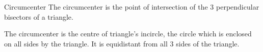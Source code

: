 	\begin{namedframe}{Circumcenter}
		The circumcenter is the point of intersection of the 3 perpendicular bisectors of a triangle.
		\begin{center}
		\end{center}
		\pause
		The circumcenter is the centre of triangle's incircle, the circle which is enclosed on all sides by the triangle. It is equidistant from all 3 sides of the triangle.
	\end{namedframe}

